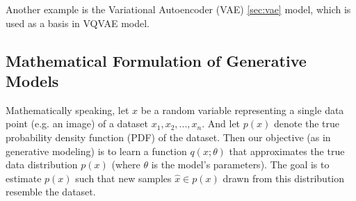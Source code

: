 Another example is the Variational Autoencoder (VAE) \cite{vae} \ref{sec:vae} model, which is used as a basis in VQVAE model. 







\subsection{Mathematical Formulation of Generative Models}
Mathematically speaking, let $x$ be a random variable representing a single data point (e.g. an image) of a dataset ${x_1,x_2,...,x_n}$. And let $p(x)$ denote the true probability density function (PDF) of the dataset. Then our objective (as in generative modeling) is to learn a function $q(x;\theta)$ that approximates the true data distribution $p(x)$ (where $\theta$ is the model's parameters). The goal is to estimate $p(x)$ such that new samples $\hat{x} \in p(x)$ drawn from this distribution resemble the dataset.

